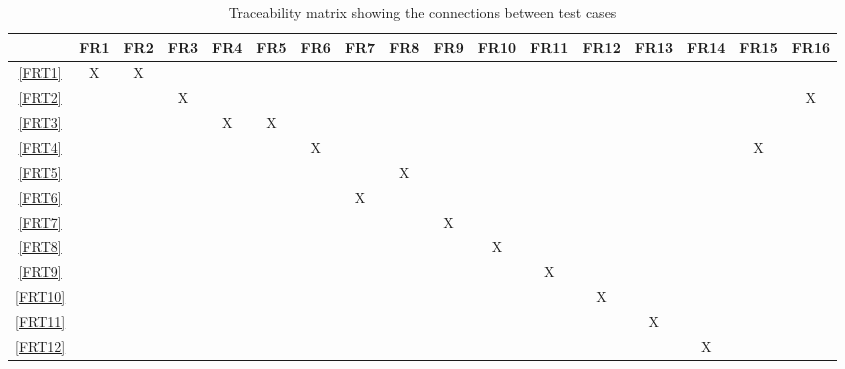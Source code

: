 \documentclass[12pt, titlepage]{article}
\begin{document}
\setlength{\tabcolsep}{2pt}
\begin{landscape}
  \begin{table}[h!]
    \centering
    \begin{tabular}{|c|c|c|c|c|c|c|c|c|c|c|c|c|c|c|c|c|} \hline
               & FR1 & FR2 & FR3 & FR4 & FR5 & FR6 & FR7 & FR8 & FR9 & FR10 & FR11 & FR12 & FR13 & FR14 & FR15 & FR16 \\ \hline
      \ref{FRT1}  & X   & X   &     &     &     &     &     &     &     &      &      &      &      &      &      &      \\ \hline
      \ref{FRT2}  &     &     & X   &     &     &     &     &     &     &      &      &      &      &      &      & X    \\ \hline
      \ref{FRT3}  &     &     &     & X   & X   &     &     &     &     &      &      &      &      &      &      &      \\ \hline
      \ref{FRT4}  &     &     &     &     &     & X   &     &     &     &      &      &      &      &      & X    &      \\ \hline
      \ref{FRT5}  &     &     &     &     &     &     &     & X   &     &      &      &      &      &      &      &      \\ \hline
      \ref{FRT6}  &     &     &     &     &     &     & X   &     &     &      &      &      &      &      &      &      \\ \hline
      \ref{FRT7}  &     &     &     &     &     &     &     &     & X   &      &      &      &      &      &      &      \\ \hline
      \ref{FRT8}  &     &     &     &     &     &     &     &     &     & X    &      &      &      &      &      &      \\ \hline
      \ref{FRT9}  &     &     &     &     &     &     &     &     &     &      & X    &      &      &      &      &      \\ \hline
      \ref{FRT10} &     &     &     &     &     &     &     &     &     &      &      & X    &      &      &      &      \\ \hline
      \ref{FRT11} &     &     &     &     &     &     &     &     &     &      &      &      & X    &      &      &      \\ \hline
      \ref{FRT12} &     &     &     &     &     &     &     &     &     &      &      &      &      & X    &      &      \\ \hline
    \end{tabular}
    \caption{Traceability matrix showing the connections between test cases
}
\end{table}
\end{landscape}
\end{document}
